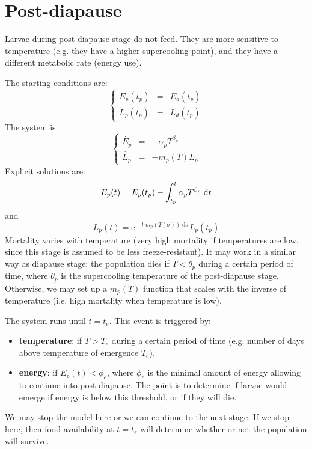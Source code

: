 \documentclass[12 pt]{article}
\begin{document}
\section{Post-diapause}
Larvae during post-diapause stage do not feed. They are more sensitive to temperature (e.g. they have a higher supercooling point),  and they have a different metabolic rate (energy use). \par
The starting conditions are:
\begin{equation}
    \left \lbrace
    \begin{array}{lcl}
        E_p(t_p) & = & E_d(t_p) \\
        L_p(t_p) & = & L_d(t_p)
    \end{array} \right .
\end{equation}
The system is:
\begin{equation}
    \left \lbrace
    \begin{array}{lcl}
        \Dot{E_p} & = & - \alpha _p T^{\beta _p} \\
        \dot{L_p} & = & - m_p(T) L_p
    \end{array} \right .
\end{equation}
Explicit solutions are:
\begin{equation}
    E_p (t) = E_p (t_p) - \int _{t_p} ^t \alpha _p T^{\beta _p} \; \mathrm{d}t \\
\end{equation}
and
\begin{equation}
    L_p (t) = \mathrm{e}^{- \int m_p(T(\sigma)) \; \mathrm{d}\sigma}L_p (t_p)
\end{equation}
Mortality varies with temperature (very high mortality if temperatures are low, since this stage is assumed to be less freeze-resistant). It may work in a similar way as diapause stage: the population dies if $T< \theta _p$ during a certain period of time, where $\theta _p$ is the supercooling temperature of the post-diapause stage. Otherwise, we may set up a $m_p(T)$ function that scales with the inverse of temperature (i.e. high mortality when temperature is low). \par
The system runs until $t=t_e$. This event is triggered by:
\begin{itemize}
    \item \textbf{temperature}: if $T> T_e$ during a certain period of time (e.g. number of days above temperature of emergence $T_e$).
    \item \textbf{energy}: if $E_p(t)< \phi _e$, where $\phi _e$ is the minimal amount of energy allowing to continue into post-diapause. The point is to determine if larvae would emerge if energy is below this threshold, or if they will die.
\end{itemize}
We may stop the model here or we can continue to the next stage. If we stop here, then food availability at $t=t_e$ will determine whether or not the population will survive.
\end{document}
